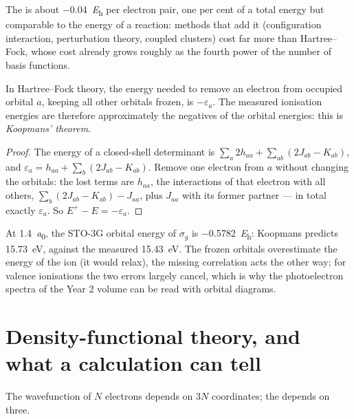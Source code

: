 The  is about \qty{-0.04}{\hartree} per electron pair, one
per cent of a total energy but comparable to the energy of a reaction:
methods that add it (configuration interaction, perturbation theory,
coupled clusters) cost far more than Hartree--Fock, whose cost already grows
roughly as the fourth power of the number of basis functions.

\begin{theorem}\label{thm:b3:computational-chemistry:koopmans}
In Hartree--Fock theory, the energy needed to remove an electron from
occupied orbital $a$, keeping all other orbitals frozen, is $-\varepsilon_a$. The
measured ionisation energies are therefore approximately the negatives of
the orbital energies: this is \emph{Koopmans' theorem}.
\end{theorem}

\begin{proof}
The energy of a closed-shell determinant is $\sum_a2h_{aa} + \sum_{ab}(2J_{ab} -
K_{ab})$, and $\varepsilon_a = h_{aa} + \sum_b(2J_{ab} - K_{ab})$. Remove one electron
from $a$ without changing the orbitals: the lost terms are $h_{aa}$, the
interactions of that electron with all others, $\sum_b(2J_{ab} - K_{ab}) -
J_{aa}$, plus $J_{aa}$ with its former partner --- in total exactly
$\varepsilon_a$. So $E^+ - E = -\varepsilon_a$.
\end{proof}

\begin{example}[Ionising \ce{H2}]\label{ex:b3:computational-chemistry:koopmans}
At \qty{1.4}{\bohr}, the STO-3G orbital energy of $\sigma_g$ is
\qty{-0.5782}{\hartree}: Koopmans predicts \qty{15.73}{eV}, against the measured
\qty{15.43}{eV}. The frozen orbitals overestimate the energy of the ion (it
would relax), the missing correlation acts the other way; for valence
ionisations the two errors largely cancel, which is why the photoelectron
spectra of the Year 2 volume can be read with orbital diagrams.
\end{example}

\section{Density-functional theory, and what a calculation can tell}

The wavefunction of $N$ electrons depends on $3N$ coordinates; the
 depends on three.

